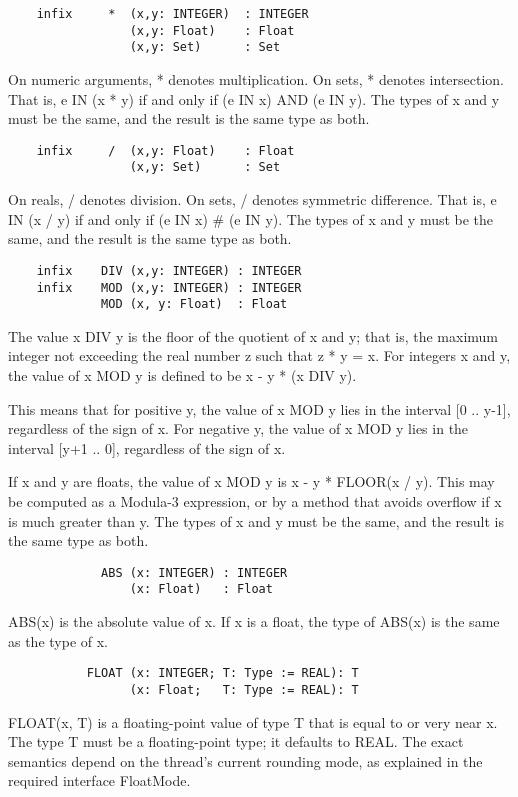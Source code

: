\documentclass[10pt]{article}
\begin{document}
  
\begin{verbatim}
    infix     *  (x,y: INTEGER)  : INTEGER
                 (x,y: Float)    : Float
                 (x,y: Set)      : Set
\end{verbatim}
  On numeric arguments, * denotes multiplication. On sets, * denotes intersection. That is, e IN (x * y) if and only if (e IN x) AND (e IN y). The types of x and y must be the same, and the result is the same type as both. 


  
\begin{verbatim}
    infix     /  (x,y: Float)    : Float
                 (x,y: Set)      : Set
\end{verbatim}
  On reals, / denotes division. On sets, / denotes symmetric difference. That is, e IN (x / y) if and only if (e IN x) \# (e IN y). The types of x and y must be the same, and the result is the same type as both. 


  
\begin{verbatim}
    infix    DIV (x,y: INTEGER) : INTEGER
    infix    MOD (x,y: INTEGER) : INTEGER
             MOD (x, y: Float)  : Float
\end{verbatim}
  The value x DIV y is the floor of the quotient of x and y; that is, the maximum integer not exceeding the real number z such that z * y = x. For integers x and y, the value of x MOD y is defined to be x - y * (x DIV y). 


  This means that for positive y, the value of x MOD y lies in the interval [0 .. y-1], regardless of the sign of x. For negative y, the value of x MOD y lies in the interval [y+1 .. 0], regardless of the sign of x. 


  If x and y are floats, the value of x MOD y is x - y * FLOOR(x / y). This may be computed as a Modula-3 expression, or by a method that avoids overflow if x is much greater than y. The types of x and y must be the same, and the result is the same type as both. 


  
\begin{verbatim}
             ABS (x: INTEGER) : INTEGER
                 (x: Float)   : Float
\end{verbatim}
  ABS(x) is the absolute value of x. If x is a float, the type of ABS(x) is the same as the type of x. 


  
\begin{verbatim}
           FLOAT (x: INTEGER; T: Type := REAL): T
                 (x: Float;   T: Type := REAL): T
\end{verbatim}
  FLOAT(x, T) is a floating-point value of type T that is equal to or very near x. The type T must be a floating-point type; it defaults to REAL. The exact semantics depend on the thread's current rounding mode, as explained in the required interface FloatMode. 
\end{document}
